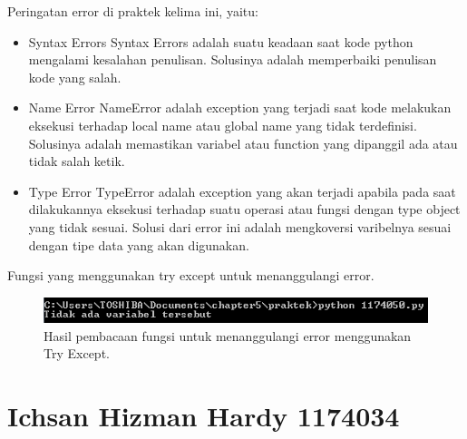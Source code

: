 \hfill \break
Peringatan error di praktek kelima ini, yaitu:
\begin{itemize}
	\item Syntax Errors
	Syntax Errors adalah suatu keadaan saat kode python mengalami kesalahan penulisan. Solusinya adalah memperbaiki penulisan kode yang salah.
	
	\item Name Error
	NameError adalah exception yang terjadi saat kode melakukan eksekusi terhadap local name atau global name yang tidak terdefinisi. Solusinya adalah memastikan variabel atau function yang dipanggil ada atau tidak salah ketik.
	
	\item Type Error
	TypeError adalah exception yang akan terjadi apabila pada saat dilakukannya eksekusi terhadap suatu operasi atau fungsi dengan type object yang tidak sesuai. Solusi dari error ini adalah mengkoversi varibelnya sesuai dengan tipe data yang akan digunakan.
\end{itemize}

\hfill \break
Fungsi yang menggunakan try except untuk menanggulangi error.



\begin{figure}[H]
	\includegraphics[width=12cm]{figures/5/1174050/Praktek/error.png}
	\centering
	\caption{Hasil pembacaan fungsi untuk menanggulangi error menggunakan Try Except.}
\end{figure}
	
\section{Ichsan Hizman Hardy 1174034}
